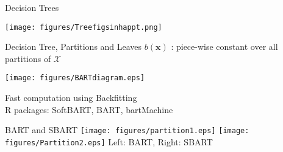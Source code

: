 \documentclass{beamer}
\begin{document}
\begin{frame}{Decision Trees}
\protect\hypertarget{review-of-bart}{}
\begin{center}\texttt{[image: figures/Treefigsinhappt.png]} \end{center}
\end{frame}
\begin{frame}{Decision Tree, Partitions and Leaves}
\protect\hypertarget{an-example-of-partition-due-tree}{}
\alert{\(b(\mathbf{x})\) : piece-wise constant over all partitions of $\mathcal{X}$}
\begin{center}\texttt{[image: figures/BARTdiagram.eps]} \end{center}

Fast computation using  Backfitting  
\\ R packages: SoftBART, BART, bartMachine
\end{frame}
\begin{frame}{BART and SBART}
\protect\hypertarget{bart-and-sbart}{}
\texttt{[image: figures/partition1.eps]}
\texttt{[image: figures/Partition2.eps]}
\vfill Left: BART, Right: SBART
\end{frame}
\end{document}
